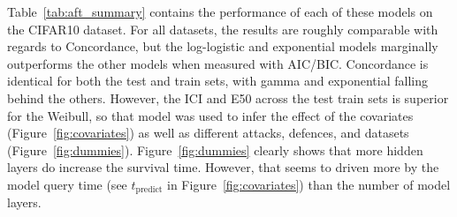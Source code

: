 Table~\ref{tab:aft_summary} contains the performance of each of these models on the CIFAR10 dataset. For all datasets, the results are roughly comparable with regards to Concordance, but the log-logistic and exponential models marginally outperforms the other models when measured with AIC/BIC\@. Concordance is identical for both the test and train sets, with gamma and exponential falling behind the others. However, the ICI  and E50  across the test train sets is superior for the Weibull, so that model was used to infer the effect of the covariates (Figure~\ref{fig:covariates}) as well as different attacks, defences, and datasets (Figure~\ref{fig:dummies}). Figure~\ref{fig:dummies} clearly shows that more hidden layers do increase the survival time. However, that seems to driven more by the model query time (see $t_{\mathrm{predict}}$ in Figure~\ref{fig:covariates}) than the number of model layers.

